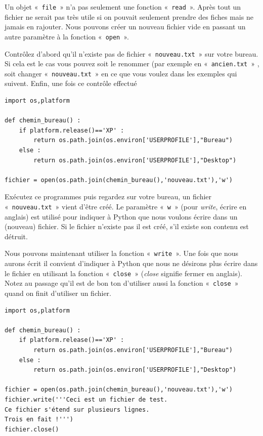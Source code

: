 Un objet «~\texttt{file}~» n'a pas seulement une fonction «~\texttt{read}~». Après tout un fichier ne serait pas très utile si on pouvait seulement prendre des fiches mais ne jamais en rajouter. Nous pouvons créer un nouveau fichier vide en passant un autre paramètre à la fonction «~\texttt{open}~».

Contrôlez d'abord qu'il n'existe pas de fichier «~\texttt{nouveau.txt}~» sur votre bureau. Si cela est le cas vous pouvez soit le renommer (par exemple en «~\texttt{ancien.txt}~» , soit changer «~\texttt{nouveau.txt}~» en ce que vous voulez dans les exemples qui suivent. Enfin, une fois ce contrôle effectué 

\begin{Verbatim}[frame=single,rulecolor=\color{mbleu}, label=à taper par exemple en reprenant l'existant]
import os,platform

def chemin_bureau() :
    if platform.release()=='XP' :
        return os.path.join(os.environ['USERPROFILE'],"Bureau")
    else :
        return os.path.join(os.environ['USERPROFILE'],"Desktop")
    
fichier = open(os.path.join(chemin_bureau(),'nouveau.txt'),'w')
\end{Verbatim}

Exécutez ce programmes puis regardez sur votre bureau, un fichier «~\texttt{nouveau.txt}~» vient d'être créé. Le paramètre «~\texttt{w}~» (pour \emph{write}, écrire en anglais) est utilisé pour indiquer à Python que nous voulons écrire dans un (nouveau) fichier. Si le fichier n'existe pas il est créé, s'il existe son contenu est détruit.

Nous pouvons maintenant utiliser la fonction «~\texttt{write}~». Une fois que nous aurons écrit il convient d'indiquer à Python que nous ne désirons plus écrire dans le fichier en utilisant la fonction «~\texttt{close}~» (\emph{close} signifie fermer en anglais). Notez au passage qu'il est de bon ton d'utiliser aussi la fonction «~\texttt{close}~» quand on finit d'utiliser un fichier.
 
\begin{Verbatim}[frame=single,rulecolor=\color{mbleu}, label=à taper par exemple en reprenant l'existant]
import os,platform

def chemin_bureau() :
    if platform.release()=='XP' :
        return os.path.join(os.environ['USERPROFILE'],"Bureau")
    else :
        return os.path.join(os.environ['USERPROFILE'],"Desktop")
    
fichier = open(os.path.join(chemin_bureau(),'nouveau.txt'),'w')
fichier.write('''Ceci est un fichier de test.
Ce fichier s'étend sur plusieurs lignes.
Trois en fait !''')
fichier.close()
\end{Verbatim}

